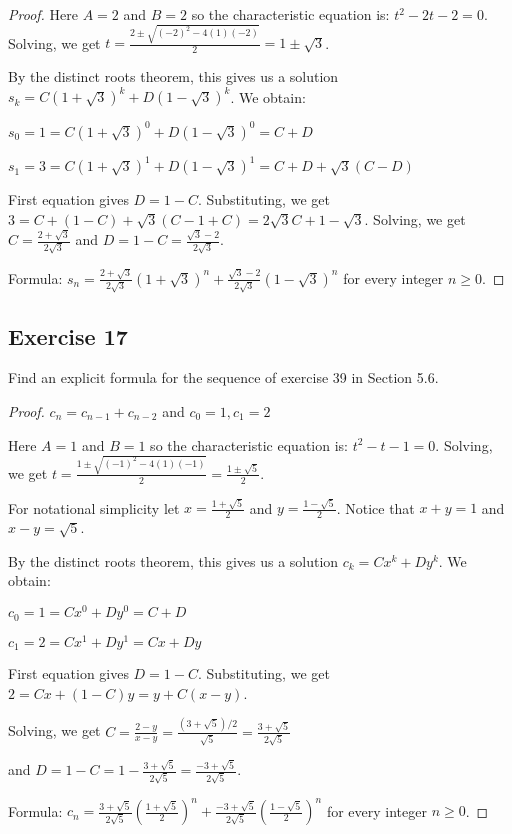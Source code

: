 \documentclass[14pt]{extarticle}
\newcommand{\dps}{\displaystyle}
\begin{document}
\begin{proof}
    Here $A = 2$ and $B = 2$ so the characteristic equation is: \(t^2 - 2t - 2 = 0\).
    Solving, we get \(\dps t = \frac{2 \pm \sqrt{(-2)^2 - 4(1)(-2)}}{2} = 1 \pm \sqrt{3}\).

    By the distinct roots theorem, this gives us a solution \(s_k = C(1+\sqrt{3})^k + D(1-\sqrt{3})^k\). We obtain:

    \(s_0 = 1 = C(1+\sqrt{3})^0 + D(1-\sqrt{3})^0 = C + D\)

    \(s_1 = 3 = C(1+\sqrt{3})^1 + D(1-\sqrt{3})^1 = C + D + \sqrt{3}(C - D)\)

    First equation gives $D = 1 - C$. Substituting, we get \(3 = C + (1 - C) + \sqrt{3}(C - 1 + C) = 2\sqrt{3}C + 1 - \sqrt{3}\).
    Solving, we get \(\dps C = \frac{2 + \sqrt{3}}{2\sqrt{3}}\) and \(\dps D = 1 - C = \frac{\sqrt{3} - 2}{2\sqrt{3}}\).

    Formula: \(\dps s_n = \frac{2 + \sqrt{3}}{2\sqrt{3}}(1+\sqrt{3})^n + \frac{\sqrt{3} - 2}{2\sqrt{3}}(1 - \sqrt{3})^n\)
    for every integer \(n \geq 0\).
\end{proof}

\subsection{Exercise 17}
Find an explicit formula for the sequence of exercise 39 in Section 5.6.

\begin{proof}
    \(c_n = c_{n-1} + c_{n-2}\) and \(c_0 = 1, c_1 = 2\)

    Here $A = 1$ and $B = 1$ so the characteristic equation is: \(t^2 - t - 1 = 0\).
    Solving, we get \(\dps t = \frac{1 \pm \sqrt{(-1)^2 - 4(1)(-1)}}{2} = \frac{1 \pm \sqrt{5}}{2}\).

    For notational simplicity let \(x = \frac{1 + \sqrt{5}}{2}\) and \(y = \frac{1 - \sqrt{5}}{2}\).
    Notice that \(x+y = 1\) and \(x - y = \sqrt{5}\).

    By the distinct roots theorem, this gives us a solution \(c_k = Cx^k + Dy^k\). We obtain:

    \(c_0 = 1 = Cx^0 + Dy^0 = C + D\)

    \(c_1 = 2 = Cx^1 + Dy^1 = Cx + Dy\)

    First equation gives $D = 1 - C$. Substituting, we get \(2 = Cx + (1 - C)y = y + C(x-y)\).

    Solving, we get \(\dps C = \frac{2-y}{x-y} = \frac{(3 + \sqrt{5}) / 2}{\sqrt{5}} = \frac{3 + \sqrt{5}}{2\sqrt{5}}\)

    and \(\dps D = 1 - C = 1 - \frac{3 + \sqrt{5}}{2\sqrt{5}} = \frac{-3 + \sqrt{5}}{2\sqrt{5}}\).

    Formula: \(\dps c_n = \frac{3 + \sqrt{5}}{2\sqrt{5}}\left(\frac{1 + \sqrt{5}}{2}\right)^n + \frac{-3 +
        \sqrt{5}}{2\sqrt{5}}\left(\frac{1 - \sqrt{5}}{2}\right)^n\)
    for every integer \(n \geq 0\).
\end{proof}
\end{document}
